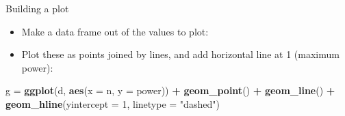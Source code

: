 \documentclass[
  ignorenonframetext,
]{beamer}
\newenvironment{Shaded}{\begin{snugshade}}{\end{snugshade}}
\newcommand{\DataTypeTok}[1]{\textcolor[rgb]{0.13,0.29,0.53}{#1}}
\newcommand{\DecValTok}[1]{\textcolor[rgb]{0.00,0.00,0.81}{#1}}
\newcommand{\KeywordTok}[1]{\textcolor[rgb]{0.13,0.29,0.53}{\textbf{#1}}}
\newcommand{\NormalTok}[1]{#1}
\newcommand{\OperatorTok}[1]{\textcolor[rgb]{0.81,0.36,0.00}{\textbf{#1}}}
\newcommand{\StringTok}[1]{\textcolor[rgb]{0.31,0.60,0.02}{#1}}
\providecommand{\tightlist}{%
  \setlength{\itemsep}{0pt}\setlength{\parskip}{0pt}}
\begin{document}
\begin{frame}[fragile]{Building a plot}
\protect\hypertarget{building-a-plot}{}

\begin{itemize}
\tightlist
\item
  Make a data frame out of the values to plot:
\end{itemize}

\begin{Shaded}
\end{Shaded}

\begin{itemize}
\tightlist
\item
  Plot these as points joined by lines, and add horizontal line at 1
  (maximum power):
\end{itemize}

\begin{Shaded}
\begin{Highlighting}[]
\NormalTok{g =}\StringTok{ }\KeywordTok{ggplot}\NormalTok{(d, }\KeywordTok{aes}\NormalTok{(}\DataTypeTok{x =}\NormalTok{ n, }\DataTypeTok{y =}\NormalTok{ power)) }\OperatorTok{+}\StringTok{ }\KeywordTok{geom_point}\NormalTok{() }\OperatorTok{+}\StringTok{ }
\StringTok{  }\KeywordTok{geom_line}\NormalTok{() }\OperatorTok{+}\StringTok{ }
\StringTok{  }\KeywordTok{geom_hline}\NormalTok{(}\DataTypeTok{yintercept =} \DecValTok{1}\NormalTok{, }\DataTypeTok{linetype =} \StringTok{"dashed"}\NormalTok{)}
\end{Highlighting}
\end{Shaded}

\end{frame}
\end{document}
